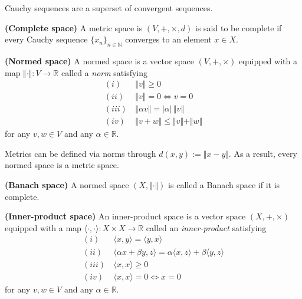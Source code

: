 Cauchy sequences are a superset of convergent sequences.

\begin{definition}
	\textbf{(Complete space)}
	A metric space is $(V,+,\times,d)$ is said to be complete if every Cauchy sequence $\{x_n\}_{n\in\mathbb{N}}$ converges to an element $x \in X$.
\end{definition}


\begin{definition}
	\textbf{(Normed space)}
	A normed space is a vector space $(V,+,\times)$ equipped with a map $\Vert \cdot \Vert: V \rightarrow \mathbb{R}$ called a \textit{norm} satisfying
	\begin{align}
	(i) \, &\Vert v \Vert \geq 0 \\
	(ii) \, &\Vert v \Vert = 0 \Leftrightarrow v = 0\\
	(iii) \, &\Vert \alpha v \Vert = |\alpha| \, \Vert v \Vert \\
	(iv) \, &\Vert  v + w \Vert \leq \Vert v \Vert + \Vert w \Vert
	\end{align}
	for any $v,w \in V$ and any $\alpha \in \mathbb{R}$.
\end{definition}

Metrics can be defined via norms through $d(x,y) := \Vert x - y\Vert$. As a result, every normed space is a metric space.

\begin{definition}
	\textbf{(Banach space)}
	A normed space $(X,\Vert \cdot \Vert)$ is called a Banach space if it is complete.
\end{definition}

\begin{definition}
	\textbf{(Inner-product space)}
	An inner-product space is a vector space $(X,+,\times)$ equipped with a map $\langle \cdot, \cdot \rangle : X \times X \rightarrow \mathbb{R}$ called an \textit{inner-product} satisfying
	\begin{align}
		(i) \, &\langle x, y \rangle = \langle y, x \rangle\\
		(ii) \, &\langle \alpha x + \beta y, z \rangle = \alpha \langle x, z \rangle + \beta \langle y, z \rangle\\
		(iii) \, &\langle x, x \rangle \geq 0 \\
		(iv) \, &\langle x, x \rangle = 0 \Leftrightarrow x = 0
	\end{align}
	for any $v,w \in V$ and any $\alpha \in \mathbb{R}$.
\end{definition}

